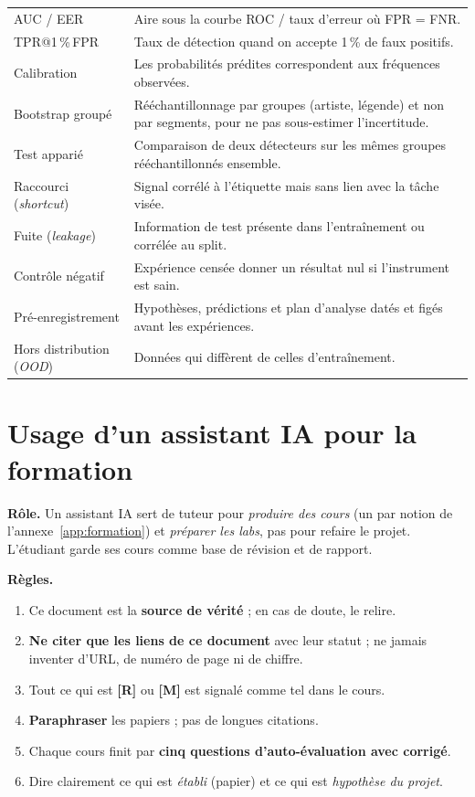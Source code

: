 \documentclass[11pt,a4paper]{article}
\makeatletter
\newcommand{\sR}{\textbf{[R]}}
\newcommand{\sM}{\textbf{[M]}}
\newcommand{\tprfpr}{TPR@1\,\%\,FPR}
\makeatother
\begin{document}
{\begin{longtable}{L{4.2cm}L{11.0cm}}
AUC / EER & Aire sous la courbe ROC / taux d'erreur où FPR = FNR.\\
\tprfpr & Taux de détection quand on accepte 1\,\% de faux positifs.\\
Calibration & Les probabilités prédites correspondent aux fréquences observées.\\
Bootstrap groupé & Rééchantillonnage par groupes (artiste, légende) et non par segments, pour ne pas sous-estimer l'incertitude.\\
Test apparié & Comparaison de deux détecteurs sur les mêmes groupes rééchantillonnés ensemble.\\
Raccourci (\emph{shortcut}) & Signal corrélé à l'étiquette mais sans lien avec la tâche visée.\\
Fuite (\emph{leakage}) & Information de test présente dans l'entraînement ou corrélée au split.\\
Contrôle négatif & Expérience censée donner un résultat nul si l'instrument est sain.\\
Pré-enregistrement & Hypothèses, prédictions et plan d'analyse datés et figés avant les expériences.\\
Hors distribution (\emph{OOD}) & Données qui diffèrent de celles d'entraînement.\\
\end{longtable}
}

\section{Usage d'un assistant IA pour la formation}
\label{app:assistant}

\textbf{Rôle.} Un assistant IA sert de tuteur pour \emph{produire des cours} (un par notion de l'annexe~\ref{app:formation}) et \emph{préparer les labs}, pas pour refaire le projet. L'étudiant garde ses cours comme base de révision et de rapport.

\textbf{Règles.}
\begin{enumerate}
  \item Ce document est la \textbf{source de vérité} ; en cas de doute, le relire.
  \item \textbf{Ne citer que les liens de ce document} avec leur statut ; ne jamais inventer d'URL, de numéro de page ni de chiffre.
  \item Tout ce qui est \sR{} ou \sM{} est signalé comme tel dans le cours.
  \item \textbf{Paraphraser} les papiers ; pas de longues citations.
  \item Chaque cours finit par \textbf{cinq questions d'auto-évaluation avec corrigé}.
  \item Dire clairement ce qui est \emph{établi} (papier) et ce qui est \emph{hypothèse du projet}.
\end{enumerate}
\end{document}

